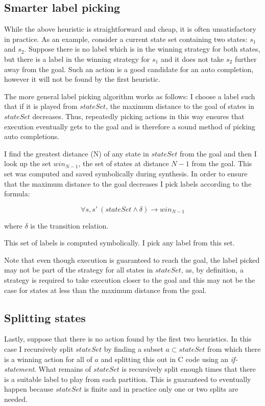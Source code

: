 \subsection{Smarter label picking}

While the above heuristic is straightforward and cheap, it is often unsatisfactory in practice. As an example, consider a current state set containing two states: $s_1$ and $s_2$. Suppose there is no label which is in the winning strategy for both states, but there is a label in the winning strategy for $s_1$ and it does not take $s_2$ further away from the goal. Such an action is a good candidate for an auto completion, however it will not be found by the first heuristic.

The more general label picking algorithm works as follows: I choose a label such that if it is played from $stateSet$, the maximum distance to the goal of states in $stateSet$ decreases. Thus, repeatedly picking actions in this way ensures that execution eventually gets to the goal and is therefore a sound method of picking auto completions. 

I find the greatest distance (N) of any state in $stateSet$ from the goal and then I look up the set $win_{N-1}$, the set of states at distance $N-1$ from the goal. This set was computed and saved symbolically during synthesis. In order to ensure that the maximum distance to the goal decreases I pick labels according to the formula:

\begin{equation}
    \forall s, s' \: (stateSet \land \delta) \rightarrow win_{N-1}
\end{equation}

\noindent where $\delta$ is the transition relation.

This set of labels is computed symbolically. I pick any label from this set.

Note that even though execution is guaranteed to reach the goal, the label picked may not be part of the strategy for all states in $stateSet$, as, by definition, a strategy is required to take execution closer to the goal and this may not be the case for states at less than the maximum distance from the goal.

\subsection{Splitting states}

Lastly, suppose that there is no action found by the first two heuristics. In this case I recursively split $stateSet$ by finding a subset $a \subset stateSet$ from which there is a winning action for all of $a$ and splitting this out in C code using an \emph{if-statement}. What remains of $stateSet$ is recursively split enough times that there is a suitable label to play from each partition. This is guaranteed to eventually happen because $stateSet$ is finite and in practice only one or two splits are needed.

